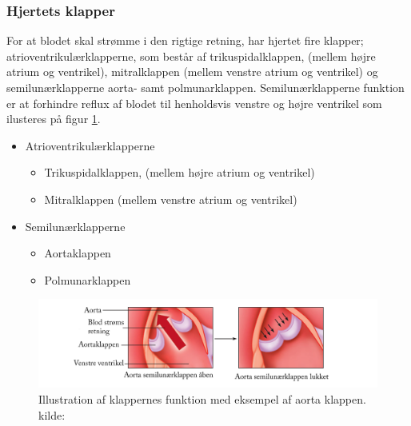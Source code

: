 \subsubsection{Hjertets klapper}
For at blodet skal strømme i den rigtige retning, har hjertet fire klapper; atrioventrikulærklapperne, som består af trikuspidalklappen, (mellem højre atrium og ventrikel), mitralklappen (mellem venstre atrium og ventrikel) og semilunærklapperne aorta- samt polmunarklappen. Semilunærklapperne funktion er at forhindre reflux af blodet til henholdsvis venstre og højre ventrikel som ilusteres på figur \ref{fig:hjerte_klap}.  \cite{gronanatomi}  

\begin{itemize} 
	\item Atrioventrikulærklapperne
		\begin{itemize} 

			\item Trikuspidalklappen, (mellem højre atrium og ventrikel)
			\item Mitralklappen (mellem venstre atrium og ventrikel)

		\end{itemize} 


	\item Semilunærklapperne

		\begin{itemize} 

			\item Aortaklappen
			\item Polmunarklappen

		\end{itemize} 		
\end{itemize} 


\begin{figure}[H] %
\begin{center}
\includegraphics[width=1\textwidth]{figures/cusp}
\end{center}
\caption{Illustration af klappernes funktion med eksempel af aorta klappen. kilde: \cite{cindy}}
\label{fig:hjerte_klap}
\end{figure}

